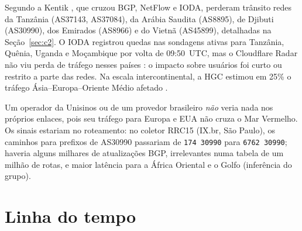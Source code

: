 \documentclass[12pt]{article}
\begin{document}
Segundo a Kentik \cite{madory2024}, que cruzou BGP, NetFlow e IODA, perderam trânsito redes
da Tanzânia (AS37143, AS37084), da Arábia Saudita (AS8895), de Djibuti (AS30990), dos
Emirados (AS8966) e do Vietnã (AS45899), detalhadas na Seção~\ref{sec:c2}. O IODA registrou quedas
nas sondagens ativas para Tanzânia, Quênia, Uganda e Moçambique por volta de 09:50~UTC,
mas o Cloudflare Radar não viu perda de tráfego nesses países \cite{belson2024}: o impacto
sobre usuários foi curto ou restrito a parte das redes. Na escala intercontinental, a HGC
estimou em 25\% o tráfego Ásia--Europa--Oriente Médio afetado \cite{hgc2024b}.

Um operador da Unisinos ou de um provedor brasileiro \emph{não} veria nada nos próprios
enlaces, pois seu tráfego para Europa e EUA não cruza o Mar Vermelho. Os sinais estariam
no roteamento: no coletor RRC15 (IX.br, São Paulo), os caminhos para prefixos de AS30990
passariam de \texttt{174~30990} para \texttt{6762~30990}; haveria alguns milhares de
atualizações BGP, irrelevantes numa tabela de um milhão de rotas, e maior latência para a
África Oriental e o Golfo (inferência do grupo).

\section{Linha do tempo}
\end{document}
